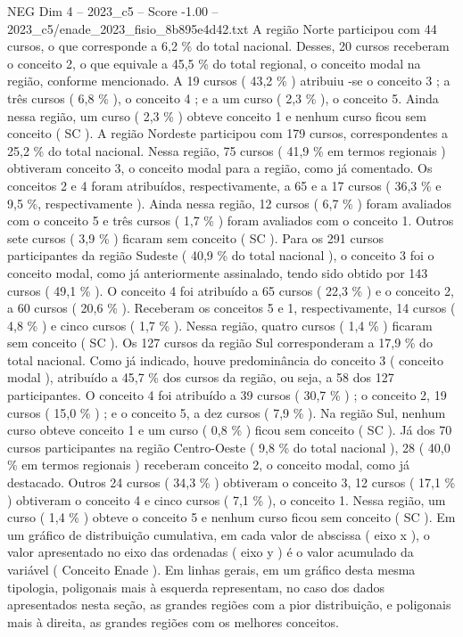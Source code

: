 \begin{textsample}{NEG Dim 4 – 2023\_c5 – Score -1.00 – 2023\_c5/enade\_2023\_fisio\_8b895e4d42.txt}
A região Norte participou com 44 cursos, o que corresponde a 6,2 \% do total nacional.
Desses, 20 cursos receberam o conceito 2, o que equivale a 45,5 \% do total regional, o conceito modal na região, conforme mencionado.
A 19 cursos ( 43,2 \% ) atribuiu -se o conceito 3 ; a três cursos ( 6,8 \% ), o conceito 4 ; e a um curso ( 2,3 \% ), o conceito 5.
Ainda nessa região, um curso ( 2,3 \% ) obteve conceito 1 e nenhum curso ficou sem conceito ( SC ).
A região Nordeste participou com 179 cursos, correspondentes a 25,2 \% do total nacional.
Nessa região, 75 cursos ( 41,9 \% em termos regionais ) obtiveram conceito 3, o conceito modal para a região, como já comentado.
Os conceitos 2 e 4 foram atribuídos, respectivamente, a 65 e a 17 cursos ( 36,3 \% e 9,5 \%, respectivamente ).
Ainda nessa região, 12 cursos ( 6,7 \% ) foram avaliados com o conceito 5 e três cursos ( 1,7 \% ) foram avaliados com o conceito 1.
Outros sete cursos ( 3,9 \% ) ficaram sem conceito ( SC ).
Para os 291 cursos participantes da região Sudeste ( 40,9 \% do total nacional ), o conceito 3 foi o conceito modal, como já anteriormente assinalado, tendo sido obtido por 143 cursos ( 49,1 \% ).
O conceito 4 foi atribuído a 65 cursos ( 22,3 \% ) e o conceito 2, a 60 cursos ( 20,6 \% ).
Receberam os conceitos 5 e 1, respectivamente, 14 cursos ( 4,8 \% ) e cinco cursos ( 1,7 \% ).
Nessa região, quatro cursos ( 1,4 \% ) ficaram sem conceito ( SC ).
Os 127 cursos da região Sul corresponderam a 17,9 \% do total nacional.
Como já indicado, houve predominância do conceito 3 ( conceito modal ), atribuído a 45,7 \% dos cursos da região, ou seja, a 58 dos 127 participantes.
O conceito 4 foi atribuído a 39 cursos ( 30,7 \% ) ; o conceito 2, 19 cursos ( 15,0 \% ) ; e o conceito 5, a dez cursos ( 7,9 \% ).
Na região Sul, nenhum curso obteve conceito 1 e um curso ( 0,8 \% ) ficou sem conceito ( SC ).
Já dos 70 cursos participantes na região Centro-Oeste ( 9,8 \% do total nacional ), 28 ( 40,0 \% em termos regionais ) receberam conceito 2, o conceito modal, como já destacado.
Outros 24 cursos ( 34,3 \% ) obtiveram o conceito 3, 12 cursos ( 17,1 \% ) obtiveram o conceito 4 e cinco cursos ( 7,1 \% ), o conceito 1.
Nessa região, um curso ( 1,4 \% ) obteve o conceito 5 e nenhum curso ficou sem conceito ( SC ).
Em um gráfico de distribuição cumulativa, em cada valor de abscissa ( eixo x ), o valor apresentado no eixo das ordenadas ( eixo y ) é o valor acumulado da variável ( Conceito Enade ).
Em linhas gerais, em um gráfico desta mesma tipologia, poligonais mais à esquerda representam, no caso dos dados apresentados nesta seção, as grandes regiões com a pior distribuição, e poligonais mais à direita, as grandes regiões com os melhores conceitos.

\end{textsample}
